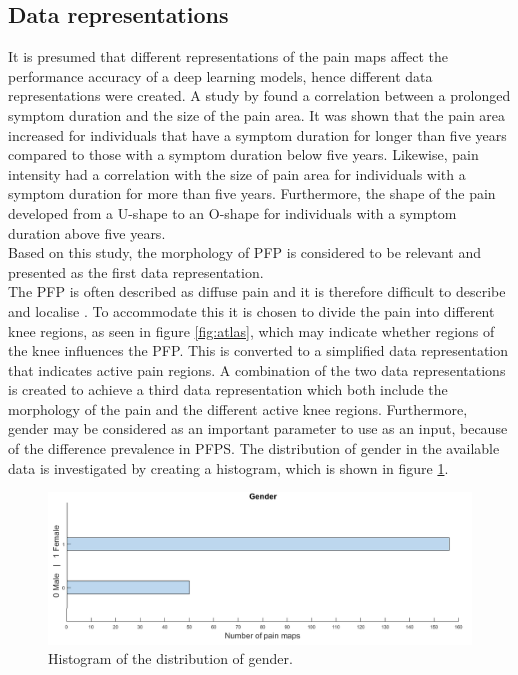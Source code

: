 \subsection{Data representations} \label{sec:representation}
It is presumed that different representations of the pain maps affect the performance accuracy of a deep learning models, hence different data representations were created.
A study by \citeauthor{Boudreau2017} found a correlation between a prolonged symptom duration and the size of the pain area. It was shown that the pain area increased for individuals that have a symptom duration for longer than five years compared to those with a symptom duration below five years. Likewise, pain intensity had a correlation with the size of pain area for individuals with a symptom duration for more than five years. Furthermore, the shape of the pain developed from a U-shape to an O-shape for individuals with a symptom duration above five years.\citep{Boudreau2017} \\
Based on this study, the morphology of PFP is considered to be relevant and presented as the first data representation.\\

\noindent
The PFP is often described as diffuse pain and it is therefore difficult to describe and localise \citep{Witvrouw2014}. To accommodate this it is chosen to divide the pain into different knee regions, as seen in figure \ref{fig:atlas}, which may indicate whether regions of the knee influences the PFP. This is converted to a simplified data representation that indicates active pain regions.\newline
\noindent
A combination of the two data representations is created to achieve a third data representation which both include the morphology of the pain and the different active knee regions.
\noindent
Furthermore, gender may be considered as an important parameter to use as an input, because of the difference prevalence in PFPS. The distribution of gender in the available data is investigated by creating a histogram, which is shown in figure \ref{fig:histogender}.

\begin{figure} [H]
\centering
\includegraphics[width=1\textwidth]{figures/histoGender}
\caption{Histogram of the distribution of gender.}
\label{fig:histogender}
\end{figure}

